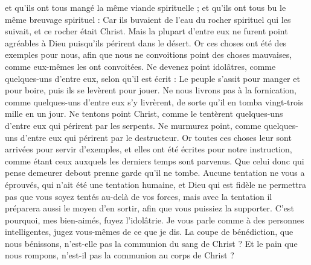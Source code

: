 \begin{multicols}{2}
et qu'ils ont tous mangé la même viande spirituelle ;
et qu'ils ont tous bu le même breuvage spirituel : Car ils buvaient de l'eau du rocher spirituel qui les suivait, et ce rocher était Christ.
Mais la plupart d’entre eux ne furent point agréables à Dieu puisqu’ils périrent dans le désert.
Or ces choses ont été des exemples pour nous, afin que nous ne convoitions point des choses mauvaises, comme eux-mêmes les ont convoitées.
Ne devenez point idolâtres, comme quelques-uns d’entre eux, selon qu'il est écrit : Le peuple s’assit pour manger et pour boire, puis ils se levèrent pour jouer.
Ne nous livrons pas à la fornication, comme quelques-uns d’entre eux s’y livrèrent, de sorte qu’il en tomba vingt-trois mille en un jour.
Ne tentons point Christ, comme le tentèrent quelques-uns d’entre eux qui périrent par les serpents.
Ne murmurez point, comme quelques-uns d’entre eux qui périrent par le destructeur.
Or toutes ces choses leur sont arrivées pour servir d’exemples, et elles ont été écrites pour notre instruction, comme étant ceux auxquels les derniers temps sont parvenus.
Que celui donc qui pense demeurer debout prenne garde qu'il ne tombe.
Aucune tentation ne vous a éprouvés, qui n’ait été une tentation humaine, et Dieu qui est fidèle ne permettra pas que vous soyez tentés au-delà de vos forces, mais avec la tentation il préparera aussi le moyen d’en sortir, afin que vous puissiez la supporter.
C'est pourquoi, mes bien-aimés, fuyez l'idolâtrie.
Je vous parle comme à des personnes intelligentes, jugez vous-mêmes de ce que je dis.
La coupe de bénédiction, que nous bénissons, n'est-elle pas la communion du sang de Christ ? Et le pain que nous rompons, n'est-il pas la communion au corps de Christ ?

\end{multicols}
